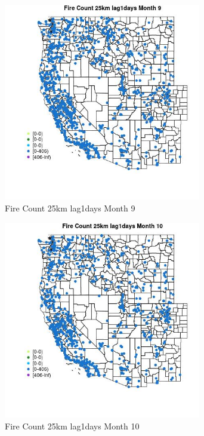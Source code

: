\begin{figure} 
\centering  
\includegraphics[width=0.77\textwidth]{Code_Outputs/Report_ML_input_PM25_Step4_part_f_de_duplicated_aveswNAs_MapObsMo9Fire_Count_25km_lag1days.jpg} 
\caption{\label{fig:Report_ML_input_PM25_Step4_part_f_de_duplicated_aveswNAsMapObsMo9Fire_Count_25km_lag1days}Fire Count 25km lag1days Month 9} 
\end{figure} 
 

\clearpage 

\begin{figure} 
\centering  
\includegraphics[width=0.77\textwidth]{Code_Outputs/Report_ML_input_PM25_Step4_part_f_de_duplicated_aveswNAs_MapObsMo10Fire_Count_25km_lag1days.jpg} 
\caption{\label{fig:Report_ML_input_PM25_Step4_part_f_de_duplicated_aveswNAsMapObsMo10Fire_Count_25km_lag1days}Fire Count 25km lag1days Month 10} 
\end{figure} 
 

